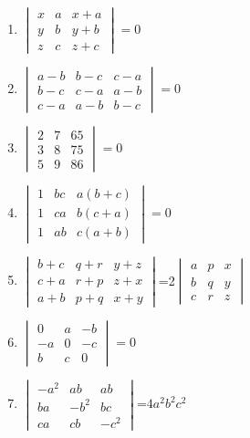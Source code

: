 \begin{enumerate}[label=\arabic*.,ref=\thesubsection.\theenumi]
\item $\begin{vmatrix}
x&a&x+a\\y&b&y+b\\z&c&z+c\end{vmatrix}=0$
\\
\solution 

\item $\begin{vmatrix}
a-b&b-c&c-a\\b-c&c-a&a-b\\c-a&a-b&b-c\end{vmatrix}=0$
\\
\solution 

\item $\begin{vmatrix}2&7&65\\3&8&75\\5&9&86\end{vmatrix}=0$
\\
\solution 

\item $\begin{vmatrix}1&bc&a(b+c)\\1&ca&b(c+a)\\1&ab&c(a+b)\end{vmatrix}=0$
\\
\solution 

\item $\begin{vmatrix}b+c& q+r& y+z\\c+a& r+p& z+x\\a+b& p+q& x+y\end{vmatrix}$=2$\begin{vmatrix} a&p&x\\b&q&y\\c&r&z\end{vmatrix}$ 
\\
\solution 

\item $\begin{vmatrix}0&a&-b\\-a&0&-c\\b&c&0\end{vmatrix}=0$
\\
\solution 

\item $\begin{vmatrix}-a^2&ab&ab\\ ba&-b^2&bc\\ ca&cb&-c^2\end{vmatrix}$=$4a^2b^2c^2$\\

\end{enumerate}
